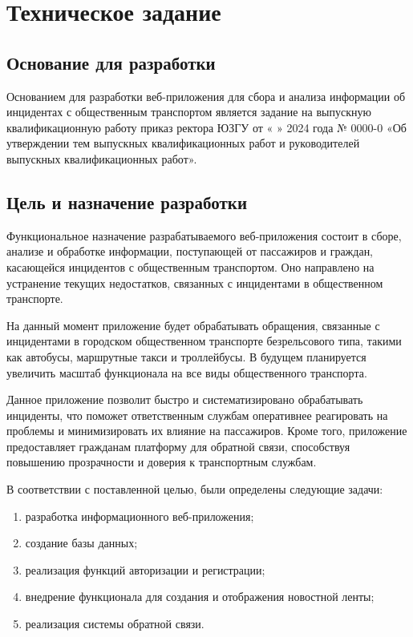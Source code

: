 \section{Техническое задание}
\subsection{Основание для разработки}

Основанием для разработки веб-приложения для сбора и анализа информации об инцидентах с общественным транспортом является задание на выпускную квалификационную работу приказ ректора ЮЗГУ от « » 2024 года № 0000-0 «Об утверждении тем выпускных квалификационных работ и руководителей выпускных квалификационных работ».


\subsection{Цель и назначение разработки}

Функциональное назначение разрабатываемого веб-приложения состоит в сборе, анализе и обработке информации, поступающей от пассажиров и граждан, касающейся инцидентов с общественным транспортом.
Оно направлено на устранение текущих недостатков, связанных с инцидентами в общественном транспорте.
 
 На данный момент приложение будет обрабатывать обращения, связанные с инцидентами в городском общественном транспорте безрельсового типа, такими как автобусы, маршрутные такси и троллейбусы. В будущем планируется увеличить масштаб функционала на все виды общественного транспорта.
 
Данное приложение позволит быстро и систематизировано обрабатывать инциденты, что поможет ответственным службам оперативнее реагировать на проблемы и минимизировать их влияние на пассажиров. Кроме того, приложение предоставляет гражданам платформу для обратной связи, способствуя повышению прозрачности и доверия к транспортным службам.

В соответствии с поставленной целью, были определены следующие задачи:
\begin{enumerate}
\item разработка информационного веб-приложения;
\item создание базы данных;
\item реализация функций авторизации и регистрации;
\item внедрение функционала для создания и отображения новостной ленты;
\item реализация системы обратной связи.
\end{enumerate}

